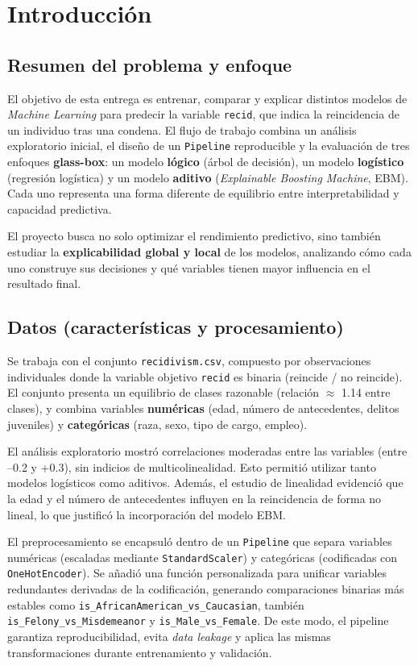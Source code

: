 \section{Introducción}

\subsection{Resumen del problema y enfoque}

El objetivo de esta entrega es entrenar, comparar y explicar distintos modelos de \textit{Machine Learning} para predecir la variable \texttt{recid}, que indica la reincidencia de un individuo tras una condena. El flujo de trabajo combina un análisis exploratorio inicial, el diseño de un \texttt{Pipeline} reproducible y la evaluación de tres enfoques \textbf{glass-box}: un modelo \textbf{lógico} (árbol de decisión), un modelo \textbf{logístico} (regresión logística) y un modelo \textbf{aditivo} (\textit{Explainable Boosting Machine}, EBM). Cada uno representa una forma diferente de equilibrio entre interpretabilidad y capacidad predictiva. 

El proyecto busca no solo optimizar el rendimiento predictivo, sino también estudiar la \textbf{explicabilidad global y local} de los modelos, analizando cómo cada uno construye sus decisiones y qué variables tienen mayor influencia en el resultado final. 

\subsection{Datos (características y procesamiento)}

Se trabaja con el conjunto \texttt{recidivism.csv}, compuesto por observaciones individuales donde la variable objetivo \texttt{recid} es binaria (reincide / no reincide). El conjunto presenta un equilibrio de clases razonable (relación $\approx$ 1.14 entre clases), y combina variables \textbf{numéricas} (edad, número de antecedentes, delitos juveniles) y \textbf{categóricas} (raza, sexo, tipo de cargo, empleo).

El análisis exploratorio mostró correlaciones moderadas entre las variables (entre --0.2 y +0.3), sin indicios de multicolinealidad. Esto permitió utilizar tanto modelos logísticos como aditivos. Además, el estudio de linealidad evidenció que la edad y el número de antecedentes influyen en la reincidencia de forma no lineal, lo que justificó la incorporación del modelo EBM.


El preprocesamiento se encapsuló dentro de un \texttt{Pipeline} que separa variables numéricas (escaladas mediante \texttt{StandardScaler}) y categóricas (codificadas con \texttt{OneHotEncoder}). Se añadió una función personalizada para unificar variables redundantes derivadas de la codificación, generando comparaciones binarias más estables como \texttt{is\_AfricanAmerican\_vs\_Caucasian}, también \texttt{is\_Felony\_vs\_Misdemeanor} y \texttt{is\_Male\_vs\_Female}. De este modo, el pipeline garantiza reproducibilidad, evita \textit{data leakage} y aplica las mismas transformaciones durante entrenamiento y validación.

